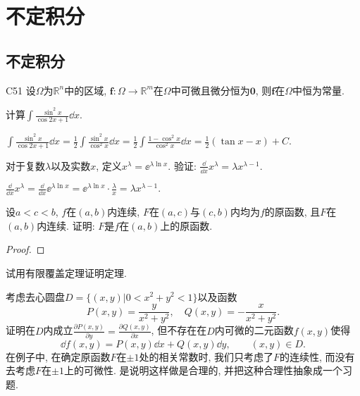 \chapter{不定积分}
\section{不定积分}
\begin{theorem}{}{C51}
设\(\Omega\)为\(\mathbb{R}^n\)中的区域, \(\boldsymbol{f}:\Omega\rightarrow\mathbb{R}^m\)在\(\Omega\)中可微且微分恒为\(\boldsymbol{0}\), 则\(\boldsymbol{f}\)在\(\Omega\)中恒为常量.
\end{theorem}
\begin{quiza}
\woe 计算\(\int \frac{\sin^2 x}{\cos 2x+1}\dd x\).
\begin{solution}
\(\int \frac{\sin^2 x}{\cos 2x+1}\dd x=\frac{1}{2}\int\frac{\sin^2x}{\cos^2x}\dd x=\frac{1}{2}\int\frac{1-\cos^2x}{\cos^2x}\dd x=\frac{1}{2}\left(\tan x-x\right)+C.\)
\end{solution}
\woe 对于复数\(\lambda\)以及实数\(x\), 定义\(x^\lambda=\ee^{\lambda\ln x}\). 验证: \(\frac{\dd}{\dd x}x^{\lambda}=\lambda x^{\lambda-1}\).
\begin{solution}
\(\frac{\dd}{\dd x}x^\lambda=\frac{\dd}{\dd x}\ee^{\lambda\ln x}=\ee^{\lambda\ln x}\cdot\frac{\lambda}{x}=\lambda x^{\lambda-1}.\)
\end{solution}
\woe 设\(a<c<b\), \(f\)在\((a,b)\)内连续, \(F\)在\((a,c)\)与\((c,b)\)内均为\(f\)的原函数, 且\(F\)在\((a,b)\)内连续. 证明: \(F\)是\(f\)在\((a,b)\)上的原函数.
\begin{proof}

\end{proof}
\woe 试用有限覆盖定理证明定理.
\end{quiza}
\begin{quizb}
\woe 考虑去心圆盘\(D=\{(x,y)|0<x^2+y^2<1\}\)以及函数\[P(x,y)=\frac{y}{x^2+y^2},\quad Q(x,y)=-\frac{x}{x^2+y^2}.\]证明在\(D\)内成立\(\frac{\partial P(x,y)}{\partial y}=\frac{\partial Q(x,y)}{\partial x}\), 但不存在在\(D\)内可微的二元函数\(f(x,y)\)使得\[\dd f(x,y)=P(x,y)\dd x+Q(x,y)\dd y,\qquad (x,y)\in D.\]
\woe 在例子中, 在确定原函数\(F\)在\(\pm 1\)处的相关常数时, 我们只考虑了\(F\)的连续性, 而没有去考虑\(F\)在\(\pm 1\)上的可微性. 是说明这样做是合理的, 并把这种合理性抽象成一个习题.
\end{quizb}
